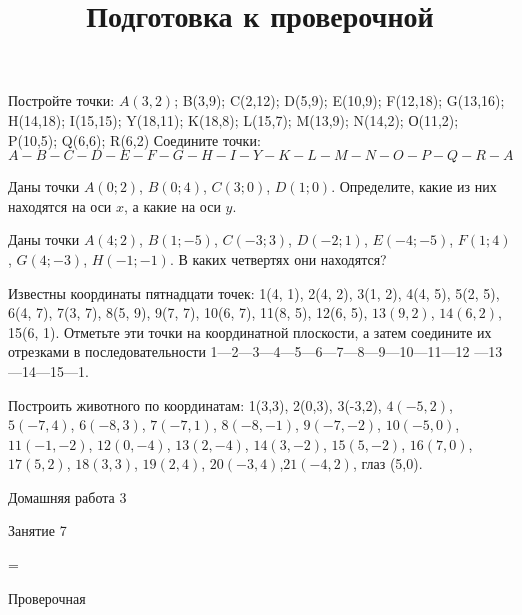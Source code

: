 \begin{class}[number=6]
	\begin{listofex}
		\item Постройте точки:
		\( A(3,2) \); B(3,9); C(2,12); D(5,9); E(10,9);
		F(12,18); G(13,16); H(14,18); I(15,15);
		Y(18,11); K(18,8); L(15,7); M(13,9);
		N(14,2); О(11,2); P(10,5); Q(6,6); R(6,2) 
		Соедините точки:
		\( A-B-C-D-E-F-G-H-I-Y-K-L-M-N-O-P-
		Q-R-A \)
		\item Даны точки \( A (0;2) \), \( B (0;4) \), \( C (3;0) \), \( D (1;0) \). Определите, какие из них находятся на оси \( x \), а какие на оси \( y \).
		\item Даны точки \( A(4;2) \), \( B(1;-5) \), \( C(-3;3) \), \( D(-2;1) \), \( E(-4;-5) \), \( F(1;4) \), \( G(4;-3) \), \( H(-1;-1) \). В каких четвертях они находятся?
		\item Известны координаты пятнадцати точек: 1(4, 1), 2(4, 2), 3(1, 2), 4(4, 5), 5(2, 5), 6(4, 7), 7(3, 7), 8(5, 9), 9(7, 7), 10(6, 7), 11(8, 5), 12(6, 5), \( 13(9, 2) \), \( 14(6, 2) \), 15(6, 1). Отметьте эти точки на координатной плоскости, а затем соедините их отрезками в последовательности 1—2—3—4—5—6—7—8—9—10—11—12 —13—14—15—1. 
		\item Построить животного по координатам:
		1(3,3), 2(0,3), 3(-3,2), \( 4(-5,2) \), \(  5(-7,4) \), \( 6(-8,3) \), \( 7(-7,1) \), \( 8(-8,-1) \), \( 9(-7,-2) \), \( 10(-5,0) \), \( 11(-1,-2) \), \( 12(0,-4) \), \( 13(2,-4) \), \( 14(3,-2) \), \( 15(5,-2) \), \( 16(7,0) \), \( 17(5,2) \), \( 18(3,3) \), \( 19(2,4) \), \( 20(-3,4) \),\(  21(-4,2) \), глаз (5,0).
	\end{listofex}
\end{class}

\begin{homework}[number=3]
	\begin{listofex}
		\item Домашняя работа 3
	\end{listofex}
\end{homework}

\begin{class}[number=7]
	\title{Подготовка к проверочной}
	\begin{listofex}
		\item Занятие 7
	\end{listofex}
\end{class}

=%
\begin{exam}
	\begin{listofex}
		\item Проверочная
	\end{listofex}
\end{exam}
